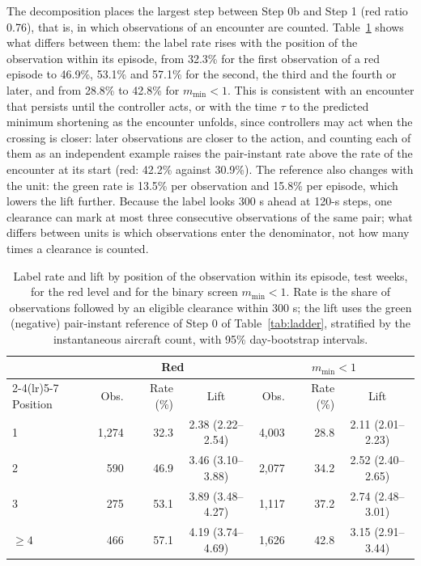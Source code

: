 \documentclass[aerospace,article,submit,moreauthors]{Definitions/mdpi}
\newcommand{\mmin}{m_{\min}}
\begin{document}
The decomposition places the largest step between Step 0b and Step 1 (red ratio 0.76), that is, in which observations of an encounter are counted. Table~\ref{tab:position} shows what differs between them: the label rate rises with the position of the observation within its episode, from 32.3\% for the first observation of a red episode to 46.9\%, 53.1\% and 57.1\% for the second, the third and the fourth or later, and from 28.8\% to 42.8\% for $\mmin<1$. This is consistent with an encounter that persists until the controller acts, or with the time $\tau$ to the predicted minimum shortening as the encounter unfolds, since controllers may act when the crossing is closer: later observations are closer to the action, and counting each of them as an independent example raises the pair-instant rate above the rate of the encounter at its start (red: 42.2\% against 30.9\%). The reference also changes with the unit: the green rate is 13.5\% per observation and 15.8\% per episode, which lowers the lift further. Because the label looks 300 s ahead at 120-s steps, one clearance can mark at most three consecutive observations of the same pair; what differs between units is which observations enter the denominator, not how many times a clearance is counted.

\begin{table}[t]
\caption{Label rate and lift by position of the observation within its episode, test weeks, for the red level and for the binary screen $\mmin<1$. Rate is the share of observations followed by an eligible clearance within 300 s; the lift uses the green (negative) pair-instant reference of Step 0 of Table~\ref{tab:ladder}, stratified by the instantaneous aircraft count, with 95\% day-bootstrap intervals.}\label{tab:position}
\centering\footnotesize\setlength{\tabcolsep}{3pt}
\begin{tabular}{@{}lrrcrrc@{}}
\toprule
 & \multicolumn{3}{c}{Red} & \multicolumn{3}{c}{$\mmin<1$}\\
\cmidrule(lr){2-4}\cmidrule(lr){5-7}
Position & Obs. & Rate (\%) & Lift & Obs. & Rate (\%) & Lift\\
\midrule
1 & 1,274 & 32.3 & 2.38 (2.22--2.54) & 4,003 & 28.8 & 2.11 (2.01--2.23)\\
2 & 590 & 46.9 & 3.46 (3.10--3.88) & 2,077 & 34.2 & 2.52 (2.40--2.65)\\
3 & 275 & 53.1 & 3.89 (3.48--4.27) & 1,117 & 37.2 & 2.74 (2.48--3.01)\\
$\geq 4$ & 466 & 57.1 & 4.19 (3.74--4.69) & 1,626 & 42.8 & 3.15 (2.91--3.44)\\
\bottomrule
\end{tabular}
\end{table}
\end{document}
